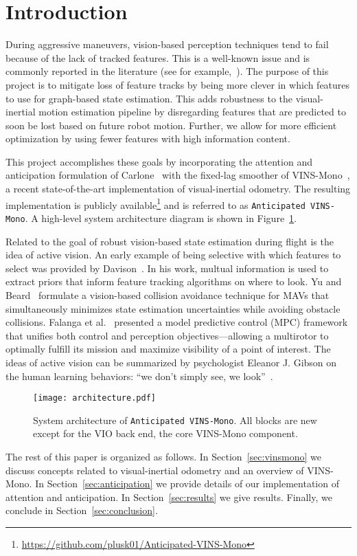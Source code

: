 
\section{Introduction}\label{sec:intro}

During aggressive maneuvers, vision-based perception techniques tend to fail because of the lack of tracked features.
This is a well-known issue and is commonly reported in the literature (see for example,~\cite{Shen2013,Falanga2017}).
The purpose of this project is to mitigate loss of feature tracks by being more clever in which features to use for graph-based state estimation.
This adds robustness to the visual-inertial motion estimation pipeline by disregarding features that are predicted to soon be lost based on future robot motion.
Further, we allow for more efficient optimization by using fewer features with high information content.

This project accomplishes these goals by incorporating the attention and anticipation formulation of Carlone~\cite{Carlone2017} with the fixed-lag smoother of VINS-Mono~\cite{Qin2018}, a recent state-of-the-art implementation of visual-inertial odometry.
The resulting implementation is publicly available\footnote{\url{https://github.com/plusk01/Anticipated-VINS-Mono}} and is referred to as \texttt{Anticipated VINS-Mono}.
A high-level system architecture diagram is shown in Figure~\ref{fig:architecture}.

Related to the goal of robust vision-based state estimation during flight is the idea of active vision.
An early example of being selective with which features to select was provided by Davison~\cite{Davison2005}.
In his work, multual information is used to extract priors that inform feature tracking algorithms on where to look.
Yu and Beard~\cite{Yu2013} formulate a vision-based collision avoidance technique for MAVs that simultaneously minimizes state estimation uncertainties while avoiding obstacle collisions.
Falanga et al.~\cite{Falanga2018} presented a model predictive control (MPC) framework that unifies both control and perception objectives---allowing a multirotor to optimally fulfill its mission and maximize visibility of a point of interest.
The ideas of active vision can be summarized by psychologist Eleanor J. Gibson on the human learning behaviors: ``we don't simply see, we look''~\cite{Gibson1988}.

\begin{figure}
\centering
\texttt{[image: architecture.pdf]} 
\caption{System architecture of \texttt{Anticipated VINS-Mono}. All blocks are new except for the VIO back end, the core VINS-Mono component.}
\label{fig:architecture} 
\end{figure}

The rest of this paper is organized as follows.
In Section~\ref{sec:vinsmono} we discuss concepts related to visual-inertial odometry and an overview of VINS-Mono.
In Section~\ref{sec:anticipation} we provide details of our implementation of attention and anticipation.
In Section~\ref{sec:results} we give results.
Finally, we conclude in Section~\ref{sec:conclusion}.
